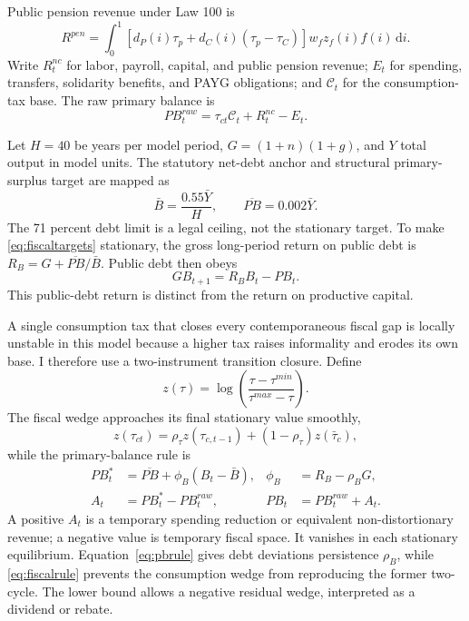 \documentclass[12pt]{article}
\newcommand{\1}{\mathbf{1}}
\newcommand{\dd}{\,\mathrm{d}}
\begin{document}
Public pension revenue under Law 100 is
\begin{equation}
R^{pen}=
\int_0^1\left[d_P(i)\tau_p+d_C(i)(\tau_p-\tau_C)\right]
w_fz_f(i)f(i)\dd i.
\end{equation}
Write $R_t^{nc}$ for labor, payroll, capital, and public pension revenue; $E_t$ for spending,
transfers, solidarity benefits, and PAYG obligations; and $\mathcal C_t$ for the
consumption-tax base. The raw primary balance is
\begin{equation}
PB_t^{raw}=\tau_{ct}\mathcal C_t+R_t^{nc}-E_t.
\label{eq:budget}
\end{equation}

Let $H=40$ be years per model period, $G=(1+n)(1+g)$, and $Y$ total output in model units. The
statutory net-debt anchor and structural primary-surplus target are mapped as
\begin{equation}
\bar B=\frac{0.55\bar Y}{H},
\qquad
\overline{PB}=0.002\bar Y.
\label{eq:fiscaltargets}
\end{equation}
The 71 percent debt limit is a legal ceiling, not the stationary target. To make
\eqref{eq:fiscaltargets} stationary, the gross long-period return on public debt is
$R_B=G+\overline{PB}/\bar B$. Public debt then obeys
\begin{equation}
G B_{t+1}=R_BB_t-PB_t.
\label{eq:debt}
\end{equation}
This public-debt return is distinct from the return on productive capital.

A single consumption tax that closes every contemporaneous fiscal gap is locally unstable in
this model because a higher tax raises informality and erodes its own base. I therefore use a
two-instrument transition closure. Define
\begin{equation}
z(\tau)=\log\left(\frac{\tau-\tau^{min}}
{\tau^{max}-\tau}\right).
\end{equation}
The fiscal wedge approaches its final stationary value smoothly,
\begin{equation}
z(\tau_{ct})=\rho_\tau z(\tau_{c,t-1})+
(1-\rho_\tau)z(\bar\tau_c),
\label{eq:fiscalrule}
\end{equation}
while the primary-balance rule is
\begin{align}
PB_t^*&=\overline{PB}+\phi_B(B_t-\bar B),
&\phi_B&=R_B-\rho_BG,\label{eq:pbrule}\\
A_t&=PB_t^*-PB_t^{raw},
&PB_t&=PB_t^{raw}+A_t.\label{eq:fiscaladjustment}
\end{align}
A positive $A_t$ is a temporary spending reduction or equivalent non-distortionary revenue;
a negative value is temporary fiscal space. It vanishes in each stationary equilibrium.
Equation~\eqref{eq:pbrule} gives debt deviations persistence $\rho_B$, while
\eqref{eq:fiscalrule} prevents the consumption wedge from reproducing the former two-cycle.
The lower bound allows a negative residual wedge, interpreted as a dividend or rebate.
\end{document}

